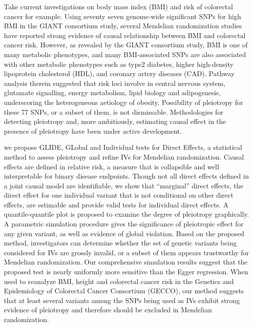 \documentclass[12pt]{article}
\newcommand{\Rpackage}[1]{\textsf{#1}}
\begin{document}
Take current investigations on body mass index (BMI) and risk of colorectal cancer for example. Using seventy seven genome-wide significant SNPs for high BMI in the GIANT consortium study, several Mendelian randomization studies have reported strong evidence of causal relationship between BMI and colorectal cancer risk. However, as revealed by the GIANT consortium study, BMI is one of many metabolic phenotypes, and many BMI-associated SNPs are also associated with other metabolic phenotypes such as type2 diabetes, higher high-density lipoprotein cholesterol (HDL), and coronary artery diseases (CAD). Pathway analysis therein suggested that risk loci involve in central nervous system, glutamate signalling, energy metabolism, lipid biology and adipogenesis, underscoring the heterogeneous aetiology of obesity. Possibility of pleiotropy for these 77 SNPs, or a subset of them, is not dismissable. Methodologies for detecting pleiotropy and, more ambitiously, estimating causal effect in the presence of pleiotropy have been under active development. 

we propose \Rpackage{GLIDE}, GLobal and Individual tests for Direct Effects, a statistical method to assess pleiotropy and refine IVs for Mendelian randomization. Causal effects are defined in relative risk, a measure that is collapsible and well interpretable for binary disease endpoints. Though not all direct effects defined in a joint causal model are identifiable, we show that ``marginal'' direct effects, the direct effect for one individual variant that is not conditional on other direct effects, are estimable and provide valid tests for individual direct effects. A quantile-quantile plot is proposed to examine the degree of pleiotropy graphically. A parametric simulation procedure gives the significance of pleiotropic effect for any given variant, as well as evidence of global violation. Based on the proposed method, investigators can determine whether the set of genetic variants being considered for IVs are grossly invalid, or a subset of them appears trustworthy for Mendelian randomization. Our comprehensive simulation results suggest that the proposed test is nearly uniformly more sensitive than the Egger regression. When used to reanalyze BMI, height and colorectal cancer risk in the Genetics and Epidemiology of Colorectal Cancer Consortium (GECCO), our method suggests that at least several variants among the SNPs being used as IVs exhibit strong evidence of pleiotropy and therefore should be excluded in Mendelian randomization.
\end{document}
